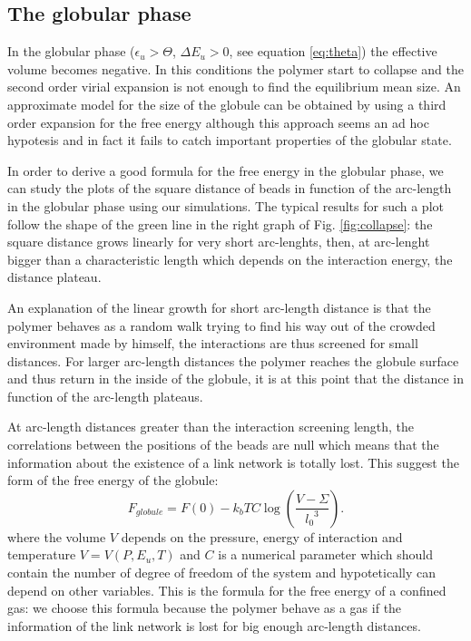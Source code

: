\documentclass[12pt,a4paper,notitlepage]{article}
\begin{document}
\subsection{The globular phase}

In the globular phase ($\epsilon_u > \Theta$, $\Delta E_u > 0$, see
equation \ref{eq:theta}) the effective volume
becomes negative. In this conditions the polymer start to collapse and
the second order virial expansion is not enough to find the
equilibrium mean size. An approximate model for the size of the
globule can be obtained by using a third order expansion for the free
energy although this approach seems an ad hoc hypotesis and in fact it
fails to catch important properties of the globular state.

In order to derive a good formula for the free energy in the globular
phase, we can study the plots of the square distance of beads in
function of the arc-length in the globular phase using our
simulations. The typical results for such a plot follow the shape of
the green line in the right graph of Fig. \ref{fig:collapse}: the
square distance grows linearly for very short arc-lenghts, then, at
arc-lenght bigger than a characteristic length which depends on
the interaction energy, the distance plateau.

An explanation of the linear growth for short arc-length distance is that
the polymer behaves as a random walk trying to find his way out of the
crowded environment made by himself, the interactions are thus
screened for small distances. For larger arc-length distances
the polymer reaches the globule surface and thus return in
the inside of the globule, it is at this point that the distance in
function of the arc-length plateaus.

At arc-length distances greater than the interaction screening length,
the correlations between the positions of the beads are
null which means that the information about the existence of a link
network is totally lost. This suggest the form of the free energy of
the globule:
\begin{equation}
F_{globule} = F(0) - k_b T C \log \left( \frac{V - \Sigma}{{l_0}^3} \right).
\end{equation}
where the volume $V$ depends on the pressure, energy of interaction
and temperature $V = V(P, E_u, T)$ and $C$ is a numerical
parameter which should contain the number of degree of freedom of the
system and hypotetically can depend on other variables. This is the
formula for the free energy of a confined gas: we choose this formula
because the polymer behave as a gas if the information of the link
network is lost for big enough arc-length distances.
\end{document}
